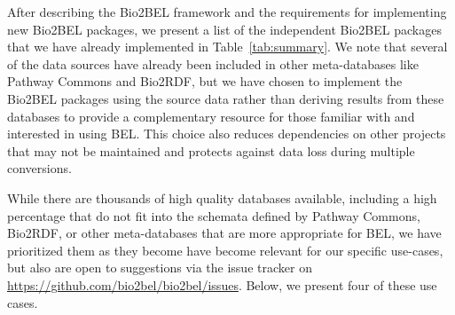 After describing the Bio2BEL framework and the requirements for implementing new Bio2BEL packages, we present a list of the independent Bio2BEL packages that we have already implemented in Table~\ref{tab:summary}.
We note that several of the data sources have already been included in other meta-databases like Pathway Commons and Bio2RDF, but we have chosen to implement the Bio2BEL packages using the source data rather than deriving results from these databases to provide a complementary resource for those familiar with and interested in using BEL\@.
This choice also reduces dependencies on other projects that may not be maintained and protects against data loss during multiple conversions.

While there are thousands of high quality databases available, including a high percentage that do not fit into the schemata defined by Pathway Commons, Bio2RDF, or other meta-databases that are more appropriate for BEL, we have prioritized them as they become have become relevant for our specific use-cases, but also are open to suggestions via the issue tracker on \url{https://github.com/bio2bel/bio2bel/issues}.
Below, we present four of these use cases.

